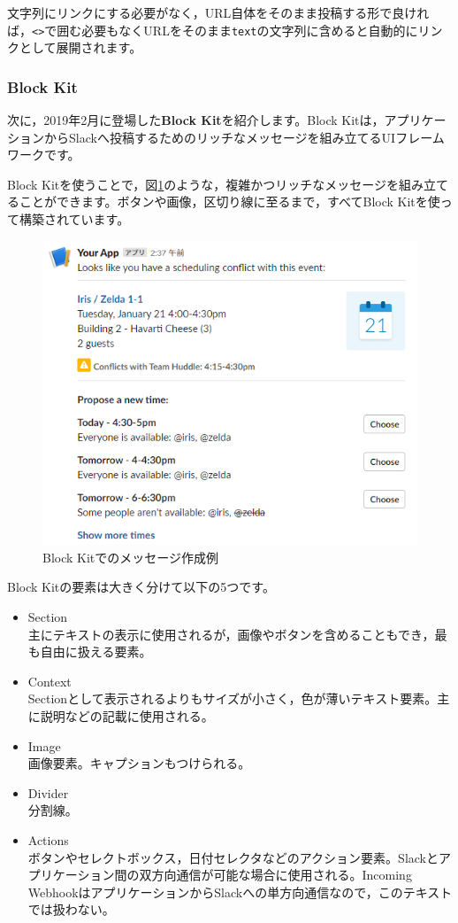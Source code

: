 \documentclass[uplatex,a4j]{jsarticle}
\begin{document}
文字列にリンクにする必要がなく，URL自体をそのまま投稿する形で良ければ，\verb|<>|で囲む必要もなくURLをそのまま\verb|text|の文字列に含めると自動的にリンクとして展開されます。

\subsubsection{Block Kit}

次に，2019年2月に登場した\textbf{Block Kit}を紹介します。Block Kitは，アプリケーションからSlackへ投稿するためのリッチなメッセージを組み立てるUIフレームワークです。

Block Kitを使うことで，図\ref{fig:block_kit_example}のような，複雑かつリッチなメッセージを組み立てることができます。ボタンや画像，区切り線に至るまで，すべてBlock Kitを使って構築されています。

\begin{figure}[H]
 \centering
 \includegraphics[keepaspectratio, scale=0.7]{images/block_kit_example.png}
 \caption{Block Kitでのメッセージ作成例}
 \label{fig:block_kit_example}
\end{figure}

Block Kitの要素は大きく分けて以下の5つです。

\begin{itemize}
\item Section \\
主にテキストの表示に使用されるが，画像やボタンを含めることもでき，最も自由に扱える要素。
\item Context\\
Sectionとして表示されるよりもサイズが小さく，色が薄いテキスト要素。主に説明などの記載に使用される。
\item Image\\
画像要素。キャプションもつけられる。
\item Divider\\
分割線。
\item Actions\\
ボタンやセレクトボックス，日付セレクタなどのアクション要素。Slackとアプリケーション間の双方向通信が可能な場合に使用される。Incoming WebhookはアプリケーションからSlackへの単方向通信なので，このテキストでは扱わない。
\end{itemize}
\end{document}
